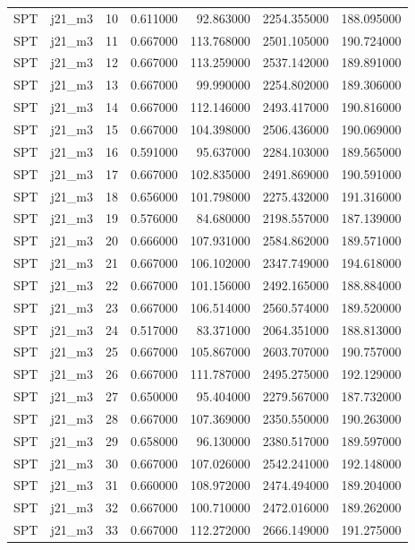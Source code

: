 \begin{tabular}{llrrrrr}
SPT & j21_m3 & 10 & 0.611000 & 92.863000 & 2254.355000 & 188.095000 \\
SPT & j21_m3 & 11 & 0.667000 & 113.768000 & 2501.105000 & 190.724000 \\
SPT & j21_m3 & 12 & 0.667000 & 113.259000 & 2537.142000 & 189.891000 \\
SPT & j21_m3 & 13 & 0.667000 & 99.990000 & 2254.802000 & 189.306000 \\
SPT & j21_m3 & 14 & 0.667000 & 112.146000 & 2493.417000 & 190.816000 \\
SPT & j21_m3 & 15 & 0.667000 & 104.398000 & 2506.436000 & 190.069000 \\
SPT & j21_m3 & 16 & 0.591000 & 95.637000 & 2284.103000 & 189.565000 \\
SPT & j21_m3 & 17 & 0.667000 & 102.835000 & 2491.869000 & 190.591000 \\
SPT & j21_m3 & 18 & 0.656000 & 101.798000 & 2275.432000 & 191.316000 \\
SPT & j21_m3 & 19 & 0.576000 & 84.680000 & 2198.557000 & 187.139000 \\
SPT & j21_m3 & 20 & 0.666000 & 107.931000 & 2584.862000 & 189.571000 \\
SPT & j21_m3 & 21 & 0.667000 & 106.102000 & 2347.749000 & 194.618000 \\
SPT & j21_m3 & 22 & 0.667000 & 101.156000 & 2492.165000 & 188.884000 \\
SPT & j21_m3 & 23 & 0.667000 & 106.514000 & 2560.574000 & 189.520000 \\
SPT & j21_m3 & 24 & 0.517000 & 83.371000 & 2064.351000 & 188.813000 \\
SPT & j21_m3 & 25 & 0.667000 & 105.867000 & 2603.707000 & 190.757000 \\
SPT & j21_m3 & 26 & 0.667000 & 111.787000 & 2495.275000 & 192.129000 \\
SPT & j21_m3 & 27 & 0.650000 & 95.404000 & 2279.567000 & 187.732000 \\
SPT & j21_m3 & 28 & 0.667000 & 107.369000 & 2350.550000 & 190.263000 \\
SPT & j21_m3 & 29 & 0.658000 & 96.130000 & 2380.517000 & 189.597000 \\
SPT & j21_m3 & 30 & 0.667000 & 107.026000 & 2542.241000 & 192.148000 \\
SPT & j21_m3 & 31 & 0.660000 & 108.972000 & 2474.494000 & 189.204000 \\
SPT & j21_m3 & 32 & 0.667000 & 100.710000 & 2472.016000 & 189.262000 \\
SPT & j21_m3 & 33 & 0.667000 & 112.272000 & 2666.149000 & 191.275000 \\

\end{tabular}
